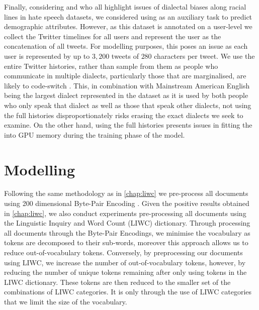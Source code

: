 Finally, considering \citet{Waseem:2018,Davidson:2019} and \citet{Sap:2019} who all highlight issues of dialectal biases along racial lines in hate speech datasets, we considered using \citet{Preotiuc-Unger:2018} as an auxiliary task to predict demographic attributes. However, as this dataset is annotated on a user-level we collect the Twitter timelines for all users and represent the user as the concatenation of all tweets. For modelling purposes, this poses an issue as each user is represented by up to $3,200$ tweets of $280$ characters per tweet. We use the entire Twitter histories, rather than sample from them as people who communicate in multiple dialects, particularly those that are marginalised, are likely to code-switch \cite{CITE: AAE code switching paper}. This, in combination with Mainstream American English being the largest dialect represented in the dataset as it is used by both people who only speak that dialect as well as those that speak other dialects, not using the full histories disproportionately risks erasing the exact dialects we seek to examine. On the other hand, using the full histories presents issues in fitting the into GPU memory during the training phase of the model.


\section{Modelling}


Following the same methodology as in \autoref{chap:liwc} we pre-process all documents using 200 dimensional Byte-Pair Encoding \cite{Heinzerling:2018}. Given the positive results obtained in \autoref{chap:liwc}, we also conduct experiments pre-processing all documents using the Linguistic Inquiry and Word Count (LIWC) dictionary. Through processing all documents through the Byte-Pair Encodings, we minimise the vocabulary as tokens are decomposed to their sub-words, moreover this approach allows us to reduce out-of-vocabulary tokens. Conversely, by preprocessing our documents using LIWC, we increase the number of out-of-vocabulary tokens, however, by reducing the number of unique tokens remaining after only using tokens in the LIWC dictionary. These tokens are then reduced to the smaller set of the combinations of LIWC categories. It is only through the use of LIWC categories that we limit the size of the vocabulary.\vspace{5mm}

